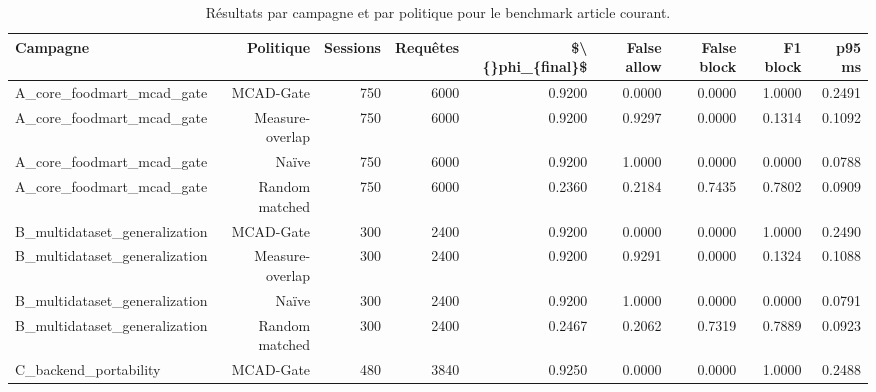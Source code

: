 \begin{table}[!t]
\centering
\caption{Résultats par campagne et par politique pour le benchmark article courant.}
\scriptsize
\setlength{\tabcolsep}{4pt}
\begin{tabular}{@{}lrrrrrrrr@{}}
\toprule
Campagne & Politique & Sessions & Requêtes & \$\textbackslash\{\}phi\_\{final\}\$ & False allow & False block & F1 block & p95 ms \\
\midrule
A\_core\_foodmart\_mcad\_gate & MCAD-Gate & 750 & 6000 & 0.9200 & 0.0000 & 0.0000 & 1.0000 & 0.2491 \\
A\_core\_foodmart\_mcad\_gate & Measure-overlap & 750 & 6000 & 0.9200 & 0.9297 & 0.0000 & 0.1314 & 0.1092 \\
A\_core\_foodmart\_mcad\_gate & Naïve & 750 & 6000 & 0.9200 & 1.0000 & 0.0000 & 0.0000 & 0.0788 \\
A\_core\_foodmart\_mcad\_gate & Random matched & 750 & 6000 & 0.2360 & 0.2184 & 0.7435 & 0.7802 & 0.0909 \\
B\_multidataset\_generalization & MCAD-Gate & 300 & 2400 & 0.9200 & 0.0000 & 0.0000 & 1.0000 & 0.2490 \\
B\_multidataset\_generalization & Measure-overlap & 300 & 2400 & 0.9200 & 0.9291 & 0.0000 & 0.1324 & 0.1088 \\
B\_multidataset\_generalization & Naïve & 300 & 2400 & 0.9200 & 1.0000 & 0.0000 & 0.0000 & 0.0791 \\
B\_multidataset\_generalization & Random matched & 300 & 2400 & 0.2467 & 0.2062 & 0.7319 & 0.7889 & 0.0923 \\
C\_backend\_portability & MCAD-Gate & 480 & 3840 & 0.9250 & 0.0000 & 0.0000 & 1.0000 & 0.2488 \\
\bottomrule
\end{tabular}
\normalsize
\label{tab:article-policy-summary}
\end{table}
